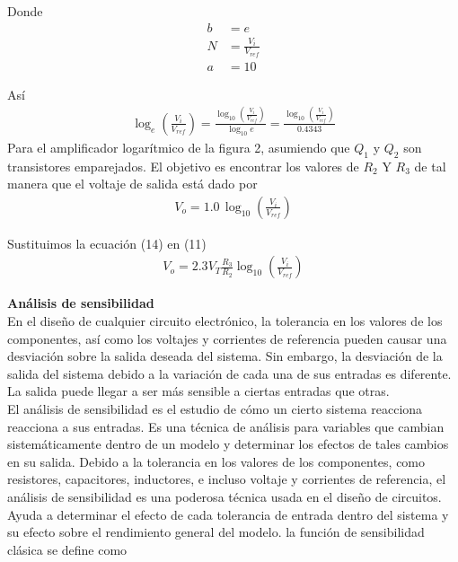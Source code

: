\documentclass{article}
\begin{document}
\noindent Donde 
\begin{subequations}
	\begin{align}
		b &= e\\
		N &= \frac{V_i}{V_{ref}}\\
		a &= 10
	\end{align}
\end{subequations}

\noindent Así
\begin{align}
	\log_{e}\left( \frac{V_i}{V_{ref}} \right) = \frac{ \log_{10}\left( \frac{V_i}{V_{ref}} \right) }{ \log_{10}e } = \frac{ \log_{10}\left( \frac{V_i}{V_{ref}} \right) }{0.4343}
\end{align}
\noindent Para el amplificador logarítmico de la figura 2, asumiendo que $Q_1$ y $Q_2$ son transistores emparejados. El objetivo es encontrar los valores de $R_2$ Y $R_3$ de tal manera que el voltaje de salida está dado por
\begin{align}
	V_o = 1.0\, \log _{10}\left( \frac{V_i}{V_{ref}} \right)\nonumber
\end{align}

\noindent Sustituimos la ecuación (14) en (11)
\begin{align}
	V_o = 2.3V_T \frac{R_3}{R_2} \log_{10} \left( \frac{V_i}{V_{ref}} \right)
\end{align}

\noindent \textbf{Análisis de sensibilidad}\\
En el diseño de cualquier circuito electrónico, la tolerancia en los valores de los componentes, así como los voltajes y corrientes de referencia pueden causar una desviación sobre la salida deseada del sistema. Sin embargo, la desviación de la salida del sistema debido a la variación de cada una de sus entradas es diferente. La salida puede llegar a ser más sensible a ciertas entradas que otras.\\

\noindent El análisis de sensibilidad es el estudio de cómo un cierto sistema reacciona reacciona a sus entradas. Es una técnica de análisis para variables que cambian sistemáticamente dentro de un modelo y determinar los efectos de tales cambios en su salida.
Debido a la tolerancia en los valores de los componentes, como resistores, capacitores, inductores, e incluso voltaje y corrientes de referencia, el análisis de sensibilidad es una poderosa técnica usada en el diseño de circuitos. Ayuda a determinar el efecto de cada tolerancia de entrada dentro del sistema y su efecto sobre el rendimiento general del modelo. la función de sensibilidad clásica se define como 
\end{document}
